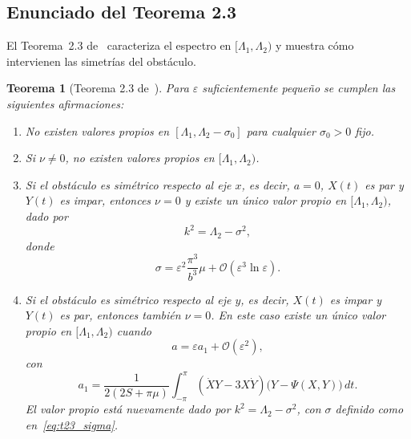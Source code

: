 \documentclass[11pt]{article}
\newtheorem{theorem}{Teorema}
\begin{document}
\subsection{Enunciado del Teorema 2.3}

El Teorema~2.3 de~\cite{Zhevandrov2025} caracteriza el espectro en
\([\Lambda_1,\Lambda_2)\) y muestra cómo intervienen las simetrías del obstáculo.

\begin{theorem}[Teorema 2.3 de~\cite{Zhevandrov2025}]
Para \(\varepsilon\) suficientemente pequeño se cumplen las siguientes afirmaciones:

\begin{enumerate}
    \item[(i)]
    No existen valores propios en
    \([\Lambda_1,\Lambda_2-\sigma_0]\)
    para cualquier \(\sigma_0>0\) fijo.

    \item[(ii)]
    Si \(\nu\neq0\), no existen valores propios en
    \([\Lambda_1,\Lambda_2)\).

    \item[(iii)]
    Si el obstáculo es simétrico respecto al eje \(x\), es decir,
    \(a=0\), \(X(t)\) es par y \(Y(t)\) es impar, entonces
    \(\nu=0\) y existe un único valor propio en
    \([\Lambda_1,\Lambda_2)\), dado por
    \begin{equation}
    k^2=\Lambda_2-\sigma^2,
    \end{equation}
    donde
    \begin{equation}
    \sigma
    =
    \varepsilon^2\frac{\pi^3}{b^3}\mu
    +\mathcal{O}(\varepsilon^3\ln\varepsilon).
    \label{eq:t23_sigma}
    \end{equation}

    \item[(iv)]
    Si el obstáculo es simétrico respecto al eje \(y\), es decir,
    \(X(t)\) es impar y \(Y(t)\) es par, entonces también
    \(\nu=0\). En este caso existe un único valor propio en
    \([\Lambda_1,\Lambda_2)\) cuando
    \begin{equation}
    a=\varepsilon a_1+\mathcal{O}(\varepsilon^2),
    \label{eq:t23_position}
    \end{equation}
    con
    \begin{equation}
    a_1=
    \frac{1}{2(2S+\pi\mu)}
    \int_{-\pi}^{\pi}
    (\dot X Y-3X\dot Y)
    \bigl(Y-\Psi(X,Y)\bigr)\,dt.
    \label{eq:t23_a1}
    \end{equation}
    El valor propio está nuevamente dado por
    \(k^2=\Lambda_2-\sigma^2\), con \(\sigma\) definido como en~\eqref{eq:t23_sigma}.
\end{enumerate}
\end{theorem}
\end{document}
